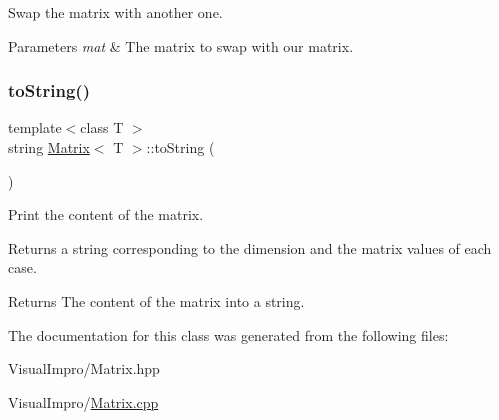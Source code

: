 Swap the matrix with another one. 


\begin{DoxyParams}{Parameters}
{\em mat} & The matrix to swap with our matrix. \\
\hline
\end{DoxyParams}
\mbox{\label{class_matrix_af097d64195b0bfa5842d9ee39b448297}} 
\subsubsection{\texorpdfstring{to\+String()}{toString()}}
{\footnotesize\ttfamily template$<$class T $>$ \\
string \mbox{\hyperlink{class_matrix}{Matrix}}$<$ T $>$\+::to\+String (\begin{DoxyParamCaption}{ }\end{DoxyParamCaption})}



Print the content of the matrix. 

Returns a string corresponding to the dimension and the matrix values of each case.

\begin{DoxyReturn}{Returns}
The content of the matrix into a string. 
\end{DoxyReturn}


The documentation for this class was generated from the following files\+:\begin{DoxyCompactItemize}
\item 
Visual\+Impro/Matrix.\+hpp\item 
Visual\+Impro/\mbox{\hyperlink{_matrix_8cpp}{Matrix.\+cpp}}\end{DoxyCompactItemize}
